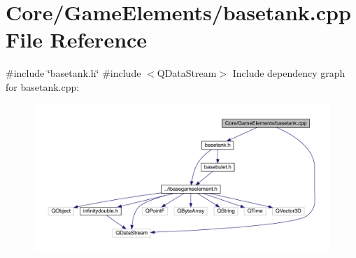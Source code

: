 \hypertarget{a00038}{}\section{Core/\+Game\+Elements/basetank.cpp File Reference}
\label{a00038}
{\ttfamily \#include \char`\"{}basetank.\+h\char`\"{}}\newline
{\ttfamily \#include $<$Q\+Data\+Stream$>$}\newline
Include dependency graph for basetank.\+cpp\+:
\nopagebreak
\begin{figure}[H]
\begin{center}
\leavevmode
\includegraphics[width=350pt]{d3/de7/a00039}
\end{center}
\end{figure}
